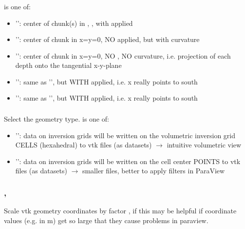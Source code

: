 \subsubsection{}
 is one of:
\begin{itemize}
\item[]'': center of chunk(s) in , , with applied 
\item[]'': center of chunk in x=y=0, NO  applied, but with curvature
\item[]'': center of chunk in x=y=0, NO , NO curvature, i.e. projection of each depth onto the tangential x-y-plane
\item[]'': same as '', but WITH  applied, i.e. x really points to south
\item[]'': same as '', but WITH  applied, i.e. x really points to south
\end{itemize}
\subsubsection{}
Select the geometry type.  is one of:
\begin{itemize}
\item[]'': data on inversion grids will be written on the volumetric inversion grid CELLS (hexahedral) to vtk files (as  datasets) $\rightarrow$ intuitive volumetric view
\item[]'': data on inversion grids will be written on the cell center POINTS to vtk files (as  datasets) $\rightarrow$ smaller files, better to apply filters in ParaView
\end{itemize}
\subsubsection{, }
Scale vtk geometry coordinates by factor , if 
this may be helpful if coordinate values (e.g. in m) get so large that they cause problems in paraview.
%
